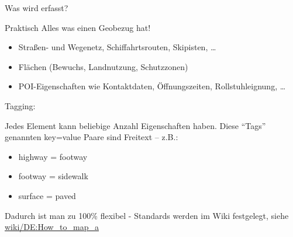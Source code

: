 \documentclass{beamer}
\begin{document}
\begin{frame}{Was wird erfasst?}

Praktisch Alles was einen Geobezug hat!

\pause

\begin{itemize}
  \item Straßen- und Wegenetz, Schiffahrtsrouten, Skipisten, \dots
  \item Flächen (Bewuchs, Landnutzung, Schutzzonen)
  \item POI-Eigenschaften wie Kontaktdaten, Öffnungszeiten, Rollstuhleignung, \dots
\end{itemize}

\pause

Tagging: 

Jedes Element kann beliebige Anzahl Eigenschaften haben.
Diese "`Tags"' genannten key=value Paare sind Freitext -- z.B.:
\begin{itemize}
  \item highway = footway 
  \item footway = sidewalk 
  \item surface = paved 
\end{itemize}

Dadurch ist man zu 100\% flexibel - Standards werden im Wiki festgelegt, siehe \href{http://wiki.openstreetmap.org/wiki/DE:How\_to\_map\_a}{wiki/DE:How\_to\_map\_a}

\end{frame}
\end{document}
